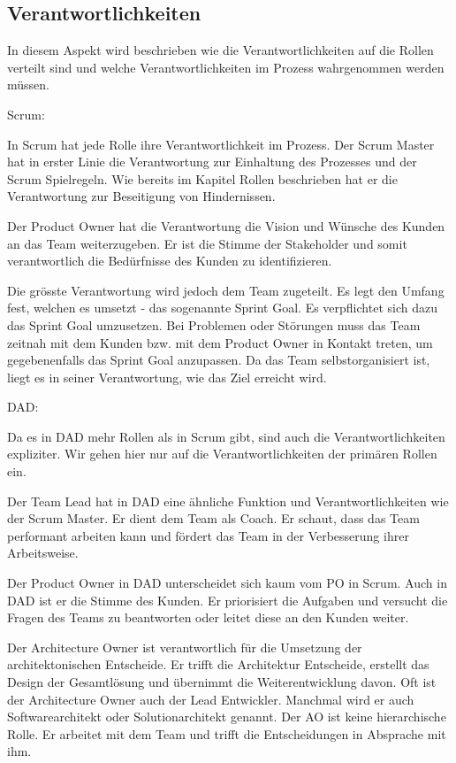 \subsection{Verantwortlichkeiten}

In diesem Aspekt wird beschrieben wie die Verantwortlichkeiten auf die Rollen verteilt sind und welche Verantwortlichkeiten im Prozess wahrgenommen werden müssen.

{\Large Scrum:} \medskip

In Scrum hat jede Rolle ihre Verantwortlichkeit im Prozess. Der Scrum Master hat in erster Linie die Verantwortung zur Einhaltung des Prozesses und der Scrum Spielregeln. Wie bereits im Kapitel Rollen beschrieben hat er die Verantwortung zur Beseitigung von Hindernissen.

Der Product Owner hat die Verantwortung die Vision und Wünsche des Kunden an das Team weiterzugeben. Er ist die Stimme der Stakeholder und somit verantwortlich die Bedürfnisse des Kunden zu identifizieren.

Die grösste Verantwortung wird jedoch dem Team zugeteilt. Es legt den Umfang fest, welchen es umsetzt - das sogenannte Sprint Goal. Es verpflichtet sich dazu das Sprint Goal umzusetzen. Bei Problemen oder Störungen muss das Team zeitnah mit dem Kunden bzw. mit dem Product Owner in Kontakt treten, um gegebenenfalls das Sprint Goal anzupassen. Da das Team selbstorganisiert ist, liegt es in seiner Verantwortung, wie das Ziel erreicht wird.

\smallskip
{\Large DAD:} \medskip

Da es in DAD mehr Rollen als in Scrum gibt, sind auch die Verantwortlichkeiten expliziter.
Wir gehen hier nur auf die Verantwortlichkeiten der primären Rollen ein.

Der Team Lead hat in DAD eine ähnliche Funktion und Verantwortlichkeiten wie der Scrum Master. Er dient dem Team als Coach. Er schaut, dass das Team performant arbeiten kann und fördert das Team in der Verbesserung ihrer Arbeitsweise.

Der Product Owner in DAD unterscheidet sich kaum vom PO in Scrum. Auch in DAD ist er die Stimme des Kunden. Er priorisiert die Aufgaben und versucht die Fragen des Teams zu beantworten oder leitet diese an den Kunden weiter.

Der Architecture Owner ist verantwortlich für die Umsetzung der architektonischen Entscheide. Er trifft die Architektur Entscheide, erstellt das Design der Gesamtlösung und übernimmt die Weiterentwicklung davon. Oft ist der Architecture Owner auch der Lead Entwickler. Manchmal wird er auch Softwarearchitekt oder Solutionarchitekt genannt. Der AO ist keine hierarchische Rolle. Er arbeitet mit dem Team und trifft die Entscheidungen in Absprache mit ihm.

